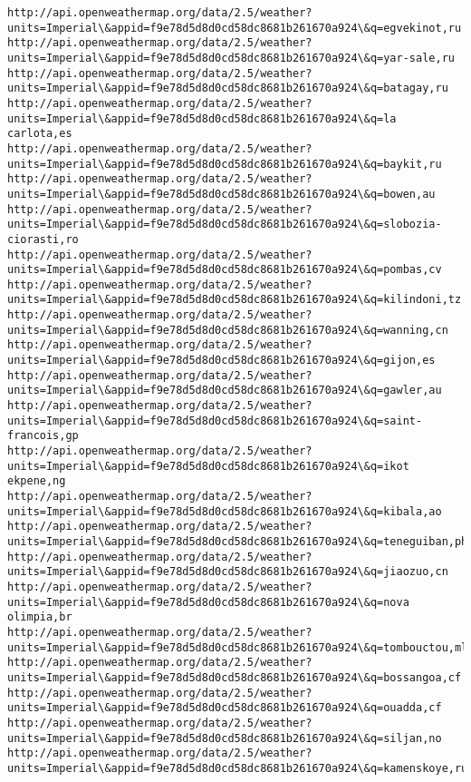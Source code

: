 \documentclass[11pt]{article}
\begin{document}
\begin{Verbatim}[commandchars=\\\{\}]
http://api.openweathermap.org/data/2.5/weather?units=Imperial\&appid=f9e78d5d8d0cd58dc8681b261670a924\&q=egvekinot,ru
http://api.openweathermap.org/data/2.5/weather?units=Imperial\&appid=f9e78d5d8d0cd58dc8681b261670a924\&q=yar-sale,ru
http://api.openweathermap.org/data/2.5/weather?units=Imperial\&appid=f9e78d5d8d0cd58dc8681b261670a924\&q=batagay,ru
http://api.openweathermap.org/data/2.5/weather?units=Imperial\&appid=f9e78d5d8d0cd58dc8681b261670a924\&q=la carlota,es
http://api.openweathermap.org/data/2.5/weather?units=Imperial\&appid=f9e78d5d8d0cd58dc8681b261670a924\&q=baykit,ru
http://api.openweathermap.org/data/2.5/weather?units=Imperial\&appid=f9e78d5d8d0cd58dc8681b261670a924\&q=bowen,au
http://api.openweathermap.org/data/2.5/weather?units=Imperial\&appid=f9e78d5d8d0cd58dc8681b261670a924\&q=slobozia-ciorasti,ro
http://api.openweathermap.org/data/2.5/weather?units=Imperial\&appid=f9e78d5d8d0cd58dc8681b261670a924\&q=pombas,cv
http://api.openweathermap.org/data/2.5/weather?units=Imperial\&appid=f9e78d5d8d0cd58dc8681b261670a924\&q=kilindoni,tz
http://api.openweathermap.org/data/2.5/weather?units=Imperial\&appid=f9e78d5d8d0cd58dc8681b261670a924\&q=wanning,cn
http://api.openweathermap.org/data/2.5/weather?units=Imperial\&appid=f9e78d5d8d0cd58dc8681b261670a924\&q=gijon,es
http://api.openweathermap.org/data/2.5/weather?units=Imperial\&appid=f9e78d5d8d0cd58dc8681b261670a924\&q=gawler,au
http://api.openweathermap.org/data/2.5/weather?units=Imperial\&appid=f9e78d5d8d0cd58dc8681b261670a924\&q=saint-francois,gp
http://api.openweathermap.org/data/2.5/weather?units=Imperial\&appid=f9e78d5d8d0cd58dc8681b261670a924\&q=ikot ekpene,ng
http://api.openweathermap.org/data/2.5/weather?units=Imperial\&appid=f9e78d5d8d0cd58dc8681b261670a924\&q=kibala,ao
http://api.openweathermap.org/data/2.5/weather?units=Imperial\&appid=f9e78d5d8d0cd58dc8681b261670a924\&q=teneguiban,ph
http://api.openweathermap.org/data/2.5/weather?units=Imperial\&appid=f9e78d5d8d0cd58dc8681b261670a924\&q=jiaozuo,cn
http://api.openweathermap.org/data/2.5/weather?units=Imperial\&appid=f9e78d5d8d0cd58dc8681b261670a924\&q=nova olimpia,br
http://api.openweathermap.org/data/2.5/weather?units=Imperial\&appid=f9e78d5d8d0cd58dc8681b261670a924\&q=tombouctou,ml
http://api.openweathermap.org/data/2.5/weather?units=Imperial\&appid=f9e78d5d8d0cd58dc8681b261670a924\&q=bossangoa,cf
http://api.openweathermap.org/data/2.5/weather?units=Imperial\&appid=f9e78d5d8d0cd58dc8681b261670a924\&q=ouadda,cf
http://api.openweathermap.org/data/2.5/weather?units=Imperial\&appid=f9e78d5d8d0cd58dc8681b261670a924\&q=siljan,no
http://api.openweathermap.org/data/2.5/weather?units=Imperial\&appid=f9e78d5d8d0cd58dc8681b261670a924\&q=kamenskoye,ru

\end{Verbatim}
\end{document}
